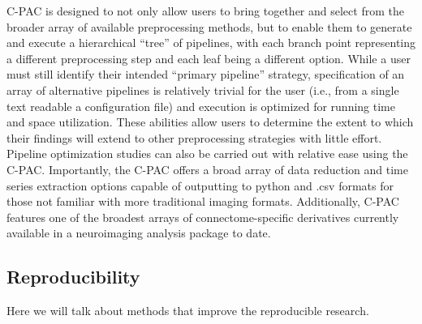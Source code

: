 C-PAC is designed to not only allow users to bring together and select from the broader array of available preprocessing methods, but to enable them to generate and execute a hierarchical “tree” of pipelines, with each branch point representing a different preprocessing step and each leaf being a different option. While a user must still identify their intended “primary pipeline” strategy, specification of an array of alternative pipelines is relatively trivial for the user (i.e., from a single text readable a configuration file) and execution is optimized for running time and space utilization. These abilities allow users to determine the extent to which their findings will extend to other preprocessing strategies with little effort. Pipeline optimization studies can also be carried out with relative ease using the C-PAC. Importantly, the C-PAC offers a broad array of data reduction and time series extraction options capable of outputting to python and .csv formats for those not familiar with more traditional imaging formats. Additionally, C-PAC features one of the broadest arrays of connectome-specific derivatives currently available in a neuroimaging analysis package to date. 


\subsection{Reproducibility}
\label{reproducibility}

Here we will talk about methods that improve the reproducible research.
